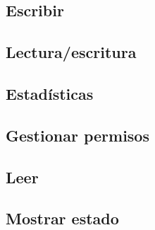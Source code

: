 \subsection{Escribir}
\subsection{Lectura/escritura}
\subsection{Estadísticas}
\subsection{Gestionar permisos}
\subsection{Leer}
\subsection{Mostrar estado}


